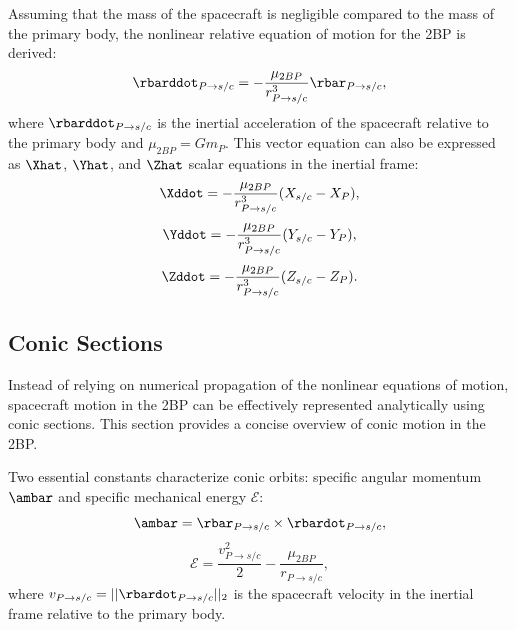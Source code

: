 Assuming that the mass of the spacecraft is negligible compared to the mass of the primary body,
the nonlinear relative equation of motion for the 2BP is derived\cite{Vallado:2013,Canales:2021b}:
\begin{equation}
    \rbarddot_{P\rightarrow s/c}=-\frac{\mu_{2BP}}{r_{P\rightarrow s/c}^{3}}\rbar_{P\rightarrow s/c},
    \label{eq:TBPEoM}
\end{equation}
where $\rbarddot_{P\rightarrow s/c}$ is the inertial acceleration of the spacecraft relative to the
primary body and $\mu_{2BP}=Gm_{P}$. This vector equation can also be expressed as $\Xhat$,
$\Yhat$, and $\Zhat$ scalar equations in the inertial frame:
\begin{equation}
    \Xddot=-\frac{\mu_{2BP}}{r_{P\rightarrow s/c}^{3}}(X_{s/c}-X_{P}),
    \label{eq:TBPEoMX}
\end{equation}
\begin{equation}
    \Yddot=-\frac{\mu_{2BP}}{r_{P\rightarrow s/c}^{3}}(Y_{s/c}-Y_{P}),
    \label{eq:TBPEoMY}
\end{equation}
\begin{equation}
    \Zddot=-\frac{\mu_{2BP}}{r_{P\rightarrow s/c}^{3}}(Z_{s/c}-Z_{P}).
    \label{eq:TBPEoMZ}
\end{equation}

\subsection{Conic Sections}
Instead of relying on numerical propagation of the nonlinear equations of motion, spacecraft motion
in the 2BP can be effectively represented analytically using conic sections. This section provides
a concise overview of conic motion in the 2BP.

Two essential constants characterize conic orbits: specific angular momentum $\ambar$ and specific
mechanical energy $\mathcal{E}$:
\begin{equation}
    \ambar=\rbar_{P\rightarrow s/c}\times\rbardot_{P\rightarrow s/c},
    \label{eq:angularmomentum}
\end{equation}
\begin{equation}
    \mathcal{E}=\frac{v_{P\rightarrow s/c}^{2}}{2}-\frac{\mu_{2BP}}{r_{P\rightarrow s/c}},
    \label{eq:energy}
\end{equation}
where $v_{P\rightarrow s/c}=||\rbardot_{P\rightarrow s/c}||_{2}$ is the spacecraft velocity in the
inertial frame relative to the primary body.

